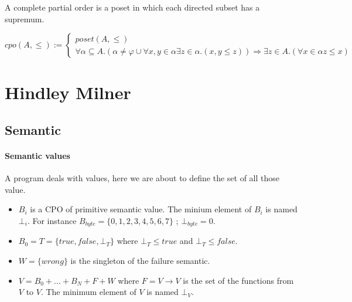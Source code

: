 \documentclass[a4paper]{report}
\begin{document}
A complete partial order is a poset in which each directed subset has a supremum.

$$cpo (A,\leq) := \left\{\begin{array}{l}
	poset (A,\leq)\\
	\forall \alpha \subseteq A. (\alpha \neq \varphi \cup \forall x,y \in \alpha \exists z\in \alpha . (x,y \leq z)) \Rightarrow \exists z\in A . (\forall x \in \alpha z \leq x)\end{array}\right.$$

\section{Hindley Milner}

\subsection{Semantic}

\paragraph{Semantic values} A program deals with values, here we are about to define the set of all those value.

\begin{itemize}
\item $B_i$ is a CPO of primitive semantic value. The minium element of $B_i$ is named $\bot_i$. For instance $B_{byte}=\{0,1,2,3,4,5,6,7\}$ ;  $\bot_{byte}=0$.
\item $B_0=T=\{true,false,\bot_T\}$ where $\bot_T \leq true$ and $\bot_T \leq false$.
\item $W=\{wrong\}$ is the singleton of the failure semantic.
\item $V = B_0 + ... + B_N + F + W$ where $F = V \to V$ is the set of the functions from $V$ to $V$. The minimum element of $V$ is named $\bot_V$.
\end{itemize}
\end{document}
